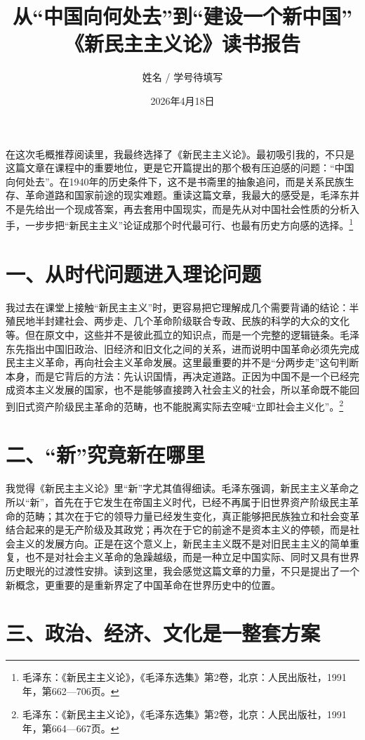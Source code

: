 \documentclass[12pt,a4paper]{article}
\title{\bfseries 从“中国向何处去”到“建设一个新中国”\\[4pt]\large 《新民主主义论》读书报告}
\author{姓名 / 学号待填写}
\date{2026年4月18日}
\begin{document}
\maketitle

在这次毛概推荐阅读里，我最终选择了《新民主主义论》。最初吸引我的，不只是这篇文章在课程中的重要地位，更是它开篇提出的那个极有压迫感的问题：“中国向何处去”。在1940年的历史条件下，这不是书斋里的抽象追问，而是关系民族生存、革命道路和国家前途的现实难题。重读这篇文章，我最大的感受是，毛泽东并不是先给出一个现成答案，再去套用中国现实，而是先从对中国社会性质的分析入手，一步步把“新民主主义”论证成那个时代最可行、也最有历史方向感的选择。\footnote{毛泽东：《新民主主义论》，《毛泽东选集》第2卷，北京：人民出版社，1991年，第662—706页。}

\section*{一、从时代问题进入理论问题}

我过去在课堂上接触“新民主主义”时，更容易把它理解成几个需要背诵的结论：半殖民地半封建社会、两步走、几个革命阶级联合专政、民族的科学的大众的文化等。但在原文中，这些并不是彼此孤立的知识点，而是一个完整的逻辑链条。毛泽东先指出中国旧政治、旧经济和旧文化之间的关系，进而说明中国革命必须先完成民主主义革命，再向社会主义革命发展。这里最重要的并不是“分两步走”这句判断本身，而是它背后的方法：先认识国情，再决定道路。正因为中国不是一个已经完成资本主义发展的国家，也不是能够直接跨入社会主义的社会，所以革命既不能回到旧式资产阶级民主革命的范畴，也不能脱离实际去空喊“立即社会主义化”。\footnote{毛泽东：《新民主主义论》，《毛泽东选集》第2卷，北京：人民出版社，1991年，第664—667页。}

\section*{二、“新”究竟新在哪里}

我觉得《新民主主义论》里“新”字尤其值得细读。毛泽东强调，新民主主义革命之所以“新”，首先在于它发生在帝国主义时代，已经不再属于旧世界资产阶级民主革命的范畴；其次在于它的领导力量已经发生变化，真正能够把民族独立和社会变革结合起来的是无产阶级及其政党；再次在于它的前途不是资本主义的停顿，而是社会主义的发展方向。正是在这个意义上，新民主主义既不是对旧民主主义的简单重复，也不是对社会主义革命的急躁越级，而是一种立足中国实际、同时又具有世界历史眼光的过渡性安排。读到这里，我会感觉这篇文章的力量，不只是提出了一个新概念，更重要的是重新界定了中国革命在世界历史中的位置。

\section*{三、政治、经济、文化是一整套方案}
\end{document}
